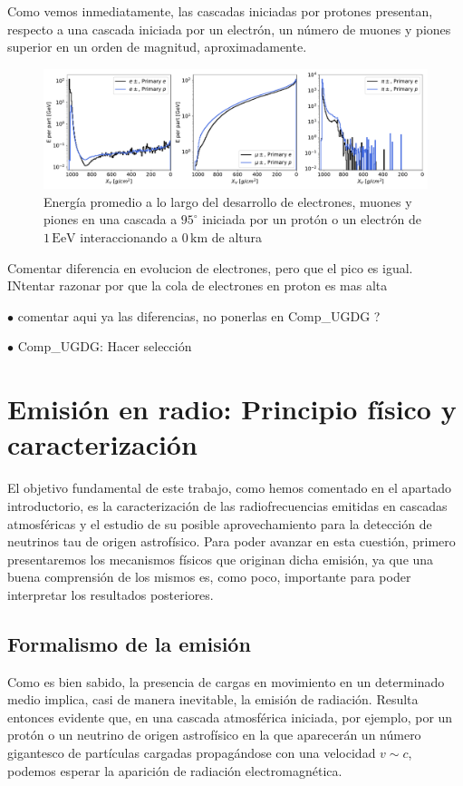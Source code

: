 \documentclass[12 pt, a4paper]{article} %
\numberwithin{equation}{section}
\numberwithin{figure}{section}
\numberwithin{table}{section}
\begin{document}
Como vemos inmediatamente, las cascadas iniciadas por protones presentan, respecto a una cascada iniciada por un electrón, un número de muones y piones superior en un orden de magnitud, aproximadamente.

\begin{figure}[H]
	\centering
	\includegraphics[width=1\linewidth]{figures/cascadas/upgoing_pe_1EeV_95deg_0km_egyperpart}
	\caption{Energía promedio a lo largo del desarrollo de electrones, muones y piones en una cascada a $95^\circ$ iniciada por un protón o un electrón de $1\,\mathrm{EeV}$ interaccionando a $0\,\mathrm{km}$ de altura}
	\label{Carac_UG_varprim_egyperpart}
\end{figure}
Comentar diferencia en evolucion de electrones, pero que el pico es igual. INtentar razonar por que la cola de electrones en proton es mas alta

$\bullet$ comentar aqui ya las diferencias, no ponerlas en Comp\_UGDG ?

$\bullet$ Comp\_UGDG: Hacer selección
	\clearpage %
	\section{Emisión en radio: Principio físico y caracterización}\label{sec3}
	El objetivo fundamental de este trabajo, como hemos comentado en el apartado introductorio, es la caracterización de las radiofrecuencias emitidas en cascadas atmosféricas y el estudio de su posible aprovechamiento para la detección de neutrinos tau de origen astrofísico. Para poder avanzar en esta cuestión, primero presentaremos los mecanismos físicos que originan dicha emisión, ya que una buena comprensión de los mismos es, como poco, importante para poder interpretar los resultados posteriores.
	\subsection{Formalismo de la emisión}\label{sec31}
	Como es bien sabido, la presencia de cargas en movimiento en un determinado medio implica, casi de manera inevitable, la emisión de radiación. Resulta entonces evidente que, en una cascada atmosférica iniciada, por ejemplo, por un protón o un neutrino de origen astrofísico en la que aparecerán un número gigantesco de partículas cargadas propagándose con una velocidad $v\sim c$, podemos esperar la aparición de radiación electromagnética.
	
\end{document}
